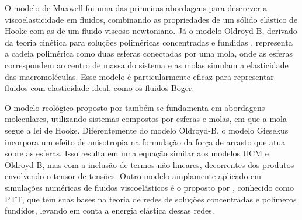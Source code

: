 O modelo de Maxwell foi uma das primeiras abordagens para descrever a viscoelasticidade em fluidos, combinando as propriedades de um sólido elástico de Hooke com as de um fluido viscoso newtoniano. Já o modelo Oldroyd-B, derivado da teoria cinética para soluções poliméricas concentradas e fundidas \cite{bird_v1_1987}, representa a cadeia polimérica como duas esferas conectadas por uma mola, onde as esferas correspondem ao centro de massa do sistema e as molas simulam a elasticidade das macromoléculas. Esse modelo é particularmente eficaz para representar fluidos com elasticidade ideal, como os fluidos Boger.

O modelo reológico proposto por  também se fundamenta em abordagens moleculares, utilizando sistemas compostos por esferas e molas, em que a mola segue a lei de Hooke. Diferentemente do modelo Oldroyd-B, o modelo Giesekus incorpora um efeito de anisotropia na formulação da força de arrasto que atua sobre as esferas. Isso resulta em uma equação similar aos modelos UCM e Oldroyd-B, mas com a inclusão de termos não lineares, decorrentes dos produtos envolvendo o tensor de tensões. Outro modelo amplamente aplicado em simulações numéricas de fluidos viscoelásticos é o proposto por , conhecido como PTT, que tem suas bases na teoria de redes de soluções concentradas e polímeros fundidos, levando em conta a energia elástica dessas redes.

